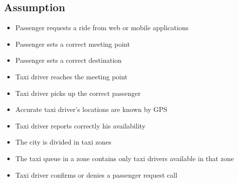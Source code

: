 \subsection{Assumption}
\begin{itemize}
	\item Passenger requests a ride from web or mobile applications
	\item Passenger sets a correct meeting point
	\item Passenger sets a correct destination
	\item Taxi driver reaches the meeting point
	\item Taxi driver picks up the correct passenger
	\item Accurate taxi driver's locations are known by GPS
	\item Taxi driver reports correctly his availability
	\item The city is divided in taxi zones
	\item The taxi queue in a zone contains only taxi drivers available in that zone
	\item Taxi driver confirms or denies a passenger request call
\end{itemize}